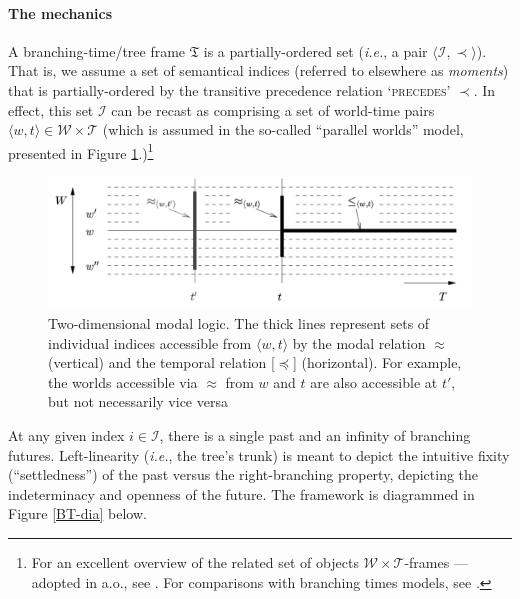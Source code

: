 \documentclass[12pt,dvipsnames]{report}
\begin{document}
\paragraph{The mechanics} A branching-time/tree frame $ \mathfrak T$ is a partially-ordered set (\textit{i.e.}, a pair $\langle \mathcal{I,\prec}\rangle $). That is, we assume a set of semantical indices (referred to elsewhere as \textit{moments}) that is partially-ordered by the transitive precedence relation \textsc{`precedes'} $ \boldsymbol\prec $. In effect, this set $ \mathcal I $ can be recast as comprising a set of world-time pairs $ \langle w,t\rangle\in\mathcal{W\times T} $ (which is assumed in the so-called ``parallel worlds'' model, presented in Figure \ref{KCH-WTframe}.)\footnote{For an excellent overview of the related set of objects $ \mathcal{W\times T} $-frames --- adopted in \citet*{Kaufmann2005,Condoravdi2002} a.o., see \citet{Kaufmann2006}. For comparisons with branching times models, see \citealt{Thomason1970,Thomason1984,Rumberg2016}.}


\begin{figure}[b]
	\centering
	\includegraphics[width=0.8\linewidth]{KCH06-95-WTframe}
		\caption[$ \mathcal{W\times T} $-frame]{Two-dimensional modal logic. The thick lines represent sets of individual indices accessible from $ \langle w,t\rangle $ by the modal relation $ \approx $ (vertical) and the temporal relation [$ \preccurlyeq $] (horizontal). For example, the worlds accessible via $ \approx $ from $ w $ and $ t $ are also accessible at $ t' $, but not necessarily vice versa \citep*[diagram and caption from][95]{Kaufmann2006}}	\label{KCH-WTframe}
\end{figure}



At any given index $ i\in\mathcal I $, there is a single past and an infinity of branching futures. Left-linearity (\textit{i.e.}, the tree's trunk) is meant to depict the intuitive fixity (``settledness'') of the past versus the right-branching property, depicting the indeterminacy and openness of the future.
The framework is diagrammed in Figure \ref{BT-dia} below.
\end{document}
